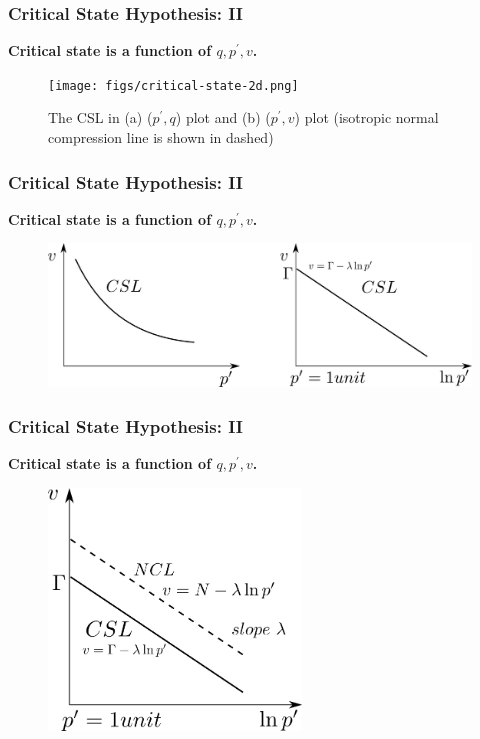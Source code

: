 \documentclass[notes]{beamer}
\begin{document}
\begin{frame}
\frametitle{Critical State Hypothesis: II}
\textbf{Critical state is a function of $q, p^\prime, v$. }
\begin{figure}
	\texttt{[image: figs/critical-state-2d.png]}
	\caption*{The CSL in (a) ($p^\prime, q$) plot and (b) ($p^\prime, v$) plot (isotropic normal compression line is shown in dashed)}
\end{figure}
\end{frame}

\begin{frame}
\frametitle{Critical State Hypothesis: II}
\textbf{Critical state is a function of $q, p^\prime, v$. }
\begin{figure}
	\includegraphics[width=\textwidth]{figs/v-lnp.png}
\end{figure}
\end{frame}

\begin{frame}
\frametitle{Critical State Hypothesis: II}
\textbf{Critical state is a function of $q, p^\prime, v$. }
\begin{figure}
	\includegraphics[width=0.6\textwidth]{figs/csl-ncl.png}
\end{figure}
\end{frame}
\end{document}
